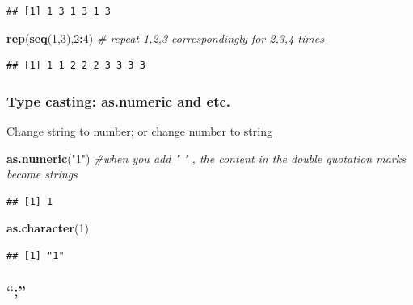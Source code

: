 \documentclass[]{article}
\newenvironment{Shaded}{\begin{snugshade}}{\end{snugshade}}
\newcommand{\CommentTok}[1]{\textcolor[rgb]{0.56,0.35,0.01}{\textit{#1}}}
\newcommand{\DecValTok}[1]{\textcolor[rgb]{0.00,0.00,0.81}{#1}}
\newcommand{\KeywordTok}[1]{\textcolor[rgb]{0.13,0.29,0.53}{\textbf{#1}}}
\newcommand{\NormalTok}[1]{#1}
\newcommand{\OperatorTok}[1]{\textcolor[rgb]{0.81,0.36,0.00}{\textbf{#1}}}
\newcommand{\StringTok}[1]{\textcolor[rgb]{0.31,0.60,0.02}{#1}}
\begin{document}
\begin{verbatim}
## [1] 1 3 1 3 1 3
\end{verbatim}

\begin{Shaded}
\begin{Highlighting}[]
\KeywordTok{rep}\NormalTok{(}\KeywordTok{seq}\NormalTok{(}\DecValTok{1}\NormalTok{,}\DecValTok{3}\NormalTok{),}\DecValTok{2}\OperatorTok{:}\DecValTok{4}\NormalTok{) }\CommentTok{# repeat 1,2,3 correspondingly for 2,3,4 times}
\end{Highlighting}
\end{Shaded}

\begin{verbatim}
## [1] 1 1 2 2 2 3 3 3 3
\end{verbatim}

\hypertarget{type-casting-as.numeric-and-etc.}{%
\subsubsection{Type casting: as.numeric and
etc.}\label{type-casting-as.numeric-and-etc.}}

Change string to number; or change number to string

\begin{Shaded}
\begin{Highlighting}[]
\KeywordTok{as.numeric}\NormalTok{(}\StringTok{"1"}\NormalTok{) }\CommentTok{#when you add  " " , the content in the double quotation marks become strings}
\end{Highlighting}
\end{Shaded}

\begin{verbatim}
## [1] 1
\end{verbatim}

\begin{Shaded}
\begin{Highlighting}[]
\KeywordTok{as.character}\NormalTok{(}\DecValTok{1}\NormalTok{)}
\end{Highlighting}
\end{Shaded}

\begin{verbatim}
## [1] "1"
\end{verbatim}

\hypertarget{section-1}{%
\subsubsection{``;''}\label{section-1}}
\end{document}
